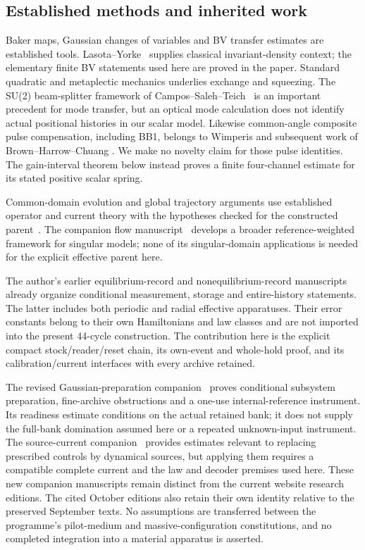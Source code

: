 \documentclass[11pt]{article}
\numberwithin{equation}{section}
\theoremstyle{definition}
\theoremstyle{remark}
\begin{document}
\subsection{Established methods and inherited work}
Baker maps, Gaussian changes of variables and BV transfer estimates
are established tools. Lasota--Yorke~\cite{LasotaYorke1973} supplies
classical invariant-density context; the elementary finite BV statements
used here are proved in the paper. Standard quadratic and metaplectic
mechanics underlies exchange and squeezing. The SU(2) beam-splitter
framework of Campos--Saleh--Teich~\cite{CamposSalehTeich1989} is an
important precedent for mode transfer, but an optical mode calculation
does not identify actual positional histories in our scalar model.
Likewise common-angle composite pulse compensation, including BB1,
belongs to Wimperis and subsequent work of Brown--Harrow--Chuang
\cite{Wimperis1994,BrownHarrowChuang2004}. We make no novelty claim for
those pulse identities. The gain-interval theorem below instead proves
a finite four-channel estimate for its stated positive scalar spring.

Common-domain evolution and global trajectory arguments use established
operator and current theory with the hypotheses checked for the
constructed parent~\cite{SchmidGriesemer2014,TTflow}. The companion
flow manuscript~\cite{RodgersP3} develops a broader reference-weighted
framework for singular models; none of its singular-domain applications
is needed for the explicit effective parent here.

The author's earlier equilibrium-record and nonequilibrium-record
manuscripts~\cite{RodgersEquilibrium2026,RodgersNonequilibrium2026}
already organize conditional measurement, storage and entire-history
statements. The latter includes both periodic and radial effective
apparatuses. Their error constants belong to their own Hamiltonians and
law classes and are not imported into the present 44-cycle construction.
The contribution here is the explicit compact stock/reader/reset chain,
its own-event and whole-hold proof, and its calibration/current interfaces
with every archive retained.

The revised Gaussian-preparation companion~\cite{RodgersP1} proves
conditional subsystem preparation, fine-archive obstructions and a one-use
internal-reference instrument. Its readiness estimate conditions on the
actual retained bank; it does not supply the full-bank domination assumed
here or a repeated unknown-input instrument. The source-current
companion~\cite{RodgersP4} provides estimates relevant to replacing
prescribed controls by dynamical sources, but applying them requires a
compatible complete current and the law and decoder premises used here.
These new companion manuscripts remain distinct from the current website
research editions. The cited October editions also retain their own
identity relative to the preserved September texts. No assumptions are
transferred between the programme's pilot-medium and massive-configuration
constitutions, and no completed integration into a material apparatus is
asserted.
\end{document}
